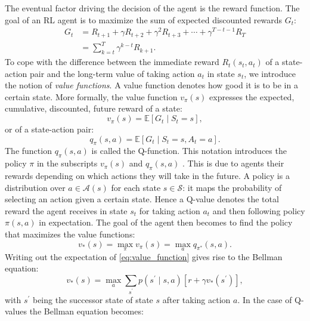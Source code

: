 \documentclass[\home/main.tex]{subfiles}
\begin{document}
The eventual factor driving the decision of the agent is the reward function. The goal of an RL agent is to maximize the sum of expected discounted rewards $G_t$:
\begin{equation}
	\begin{split}
		G_{t} & =R_{t+1}+\gamma R_{t+2}+\gamma^{2} R_{t+3}+\cdots+\gamma^{T-t-1} R_{T} \\
		&		=\sum_{k=t}^{T} \gamma^{k-t} R_{k+1}.
	\end{split}
\end{equation}
To cope with the difference between the immediate reward $R_t(s_t, a_t)$ of a state-action pair and the long-term value of taking action $a_t$ in state $s_t$, we introduce the notion of \emph{value functions}. A value function denotes how good it is to be in a certain state. More formally, the value function $v_{\pi}(s)$ expresses the expected, cumulative, discounted, future reward of a state:
\begin{equation} \label{eq:value_function}
	v_{\pi}(s)=\mathbb{E}\left[G_{t} \mid S_{t}=s\right],
\end{equation}
or of a state-action pair:
\begin{equation}
	q_{\pi}(s, a)=\mathbb{E}\left[G_{t} \mid S_{t}=s, A_{t}=a\right].
\end{equation}
The function $q_{\pi}(s, a)$ is called the Q-function. This notation introduces the policy $\pi$ in the subscripts $v_{\pi}(s)$ and $q_{\pi}(s, a)$ . This is due to agents their rewards depending on which actions they will take in the future. A policy is a distribution over $a \in \mathcal{A}(s)$ for each state $s \in \mathcal{S}$: it maps the probability of selecting an action given a certain state. Hence a Q-value denotes the total reward the agent receives in state $s_t$ for taking action $a_t$ and then following policy $\pi(s,a)$ in expectation. The goal of the agent then becomes to find the policy that maximizes the value functions:
\begin{equation}
	v_{*}(s)=\max _{\pi} v_{\pi}(s)=\max _{a} q_{\pi^{*}}(s, a).
\end{equation}
Writing out the expectation of \cref{eq:value_function} gives rise to the Bellman equation:
\begin{equation}
	v_{*}(s)=\max _{a} \sum_{s^{\prime}} p\left(s^{\prime} \mid s, a\right)\left[r+\gamma v_{*}\left(s^{\prime}\right)\right],
\end{equation}
with $s^{\prime}$ being the successor state of state $s$ after taking action $a$. In the case of Q-values the Bellman equation becomes:
\end{document}
